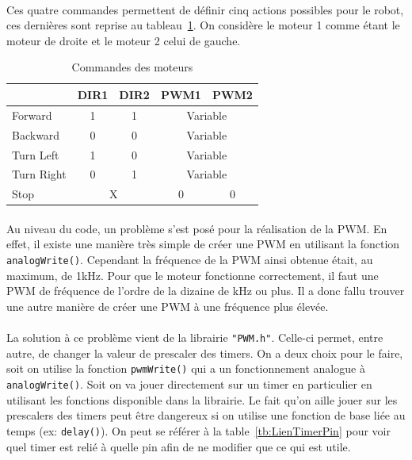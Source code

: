\paragraph{}
Ces quatre commandes permettent de définir cinq actions possibles pour le robot, ces dernières sont reprise au tableau~\ref{tb:ActionsMoteurs}. On considère le moteur 1 comme étant le moteur de droite et le moteur 2 celui de gauche. 

\begin{table}[!ht]
	\centering
	\begin{tabular}{|l|cc|cc|}
		\hline
		& DIR1 & DIR2 & PWM1 & PWM2 \\
		\hline
		Forward & 1 & 1 & \multicolumn {2}{c|}{Variable} \\
		\hline
		Backward & 0 & 0 & \multicolumn {2}{c|}{Variable} \\
		\hline
		Turn Left & 1 & 0 & \multicolumn {2}{c|}{Variable} \\
		\hline
		Turn Right & 0 & 1 & \multicolumn {2}{c|}{Variable} \\
		\hline
		Stop & \multicolumn {2}{c|}{X} & 0 & 0 \\
		\hline
	\end{tabular}
	\caption{Commandes des moteurs}
	\label{tb:ActionsMoteurs}
\end{table}

\paragraph{}
Au niveau du code, un problème s'est posé pour la réalisation de la PWM. En effet, il existe une manière très simple de créer une PWM en utilisant la fonction \lstinline$analogWrite()$. Cependant la fréquence de la PWM ainsi obtenue était, au maximum, de 1kHz. Pour que le moteur fonctionne correctement, il faut une PWM de fréquence de l'ordre de la dizaine de kHz ou plus. Il a donc fallu trouver une autre manière de créer une PWM à une fréquence plus élevée.

\paragraph{}
La solution à ce problème vient de la librairie \lstinline$"PWM.h"$. Celle-ci permet, entre autre, de changer la valeur de prescaler des timers. On a deux choix pour le faire, soit on utilise la fonction \lstinline$pwmWrite()$ qui a un fonctionnement analogue à \lstinline$analogWrite()$. Soit on va jouer directement sur un timer en particulier en utilisant les fonctions disponible dans la librairie. Le fait qu'on aille jouer sur les prescalers des timers peut être dangereux si on utilise une fonction de base liée au temps (ex: \lstinline$delay()$). On peut se référer à la table~\ref{tb:LienTimerPin} pour voir quel timer est relié à quelle pin afin de ne modifier que ce qui est utile.

